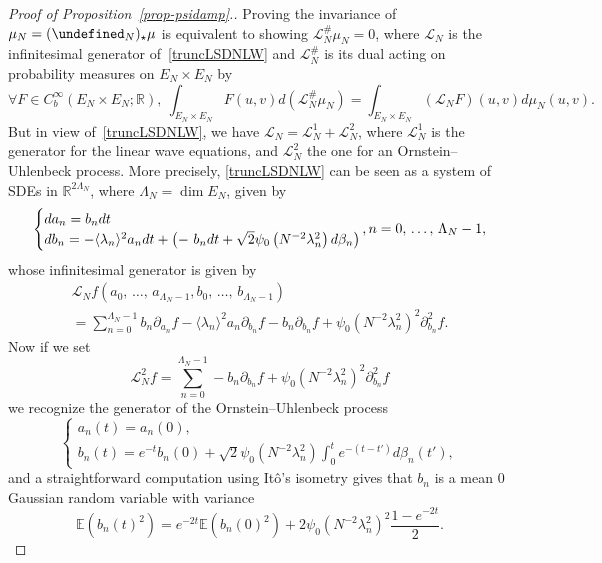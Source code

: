 \documentclass[10pt]{amsart}
\theoremstyle{definition}\newtheorem{defi}[theo]{Definition}\newtheorem{rema}[theo]{Remark}\newtheorem{exam}[theo]{Example}\newtheorem{exem}[theo]{Example}\newtheorem{nota}[theo]{Notation}
\newcommand{\R}{\mathbb{R}}
\newcommand{\E}{\mathbb{E}}
\let\P= \undefined
\newcommand{\P}{\mathbf{P}}
\renewcommand{\L}{\mathcal{L}}
\newcommand{\Ld}{\Lambda}
\newcommand{\jb}[1] {\langle #1 \rangle}
\let\oldforall\forall
\renewcommand*{\forall}{\mathrel{\oldforall}}
\begin{document}
\begin{proof}[Proof of Proposition~\ref{prop-psidamp}.]
Proving the invariance of $\mu_N=(\P_N)_{\star}\mu$ is equivalent to showing $\L_N^\#\mu_N=0$, where $\L_N$ is the infinitesimal generator of~\eqref{truncLSDNLW} and $\L_N^\#$ is its dual acting on probability measures on $E_N\times E_N$ by
\begin{equation*}
\forall F\in C^{\infty}_b(E_N\times E_N;\R),~\int_{E_N\times E_N}F(u,v)d(\L_N^\#\mu_N) = \int_{E_N\times E_N}(\L_NF)(u,v)d\mu_N(u,v).
\end{equation*}
But in view of~\eqref{truncLSDNLW}, we have $\L_N = \L_N^1+\L_N^2$, where $\L_N^1$ is the generator for the linear wave equations, and $\L_N^2$ the one for an Ornstein--Uhlenbeck process. More precisely, \eqref{truncLSDNLW} can be seen as a system of SDEs in $\R^{2\Ld_N}$, where $\Ld_N=\dim E_N$, given by
\begin{equation*}
\begin{cases}
d a_n = b_n dt\\
d b_n = -\jb{\lambda_n}^2a_ndt +\left(-\ b_ndt+\sqrt{2}\psi_0\left(N^{-2}\lambda_n^2\right)d\beta_n\right)
\end{cases}\mkern-20mu, n=0,\,\dots,\,\Ld_N-1,
\end{equation*}
whose infinitesimal generator is given by
\begin{multline*}
\L_Nf\left(a_0,\,\dots,\,a_{\Ld_N-1},b_0,\,\dots,\,b_{\Ld_N-1}\right)\\
= \sum_{n=0}^{\Ld_N-1}b_n\partial_{a_n}f-\jb{\lambda_n}^2a_n\partial_{b_n}f - b_n\partial_{b_n}f+\psi_0\left(N^{-2}\lambda_n^2\right)^2\partial_{b_n}^2f.
\end{multline*}
Now if we set
\begin{equation*}
\L_N^2f = \sum_{n=0}^{\Ld_N-1}-b_n\partial_{b_n}f+\psi_0\left(N^{-2}\lambda_n^2\right)^2\partial_{b_n}^2f
\end{equation*}
we recognize the generator of the Ornstein--Uhlenbeck process
\begin{equation*}
\begin{cases}
a_n(t)=a_n(0),\\
b_n(t)=e^{-t}b_n(0)+\sqrt{2}\psi_0\left(N^{-2}\lambda_n^2\right)\int_0^te^{-(t-t')}d\beta_n(t'),
\end{cases}
\end{equation*}
and a straightforward computation using It\^o's isometry gives that $b_n$ is a mean 0 Gaussian random variable with variance
\begin{equation*}
\E\left(b_n(t)^2\right)=e^{-2t}\E\left(b_n(0)^2\right)+2\psi_0\left(N^{-2}\lambda_n^2\right)^2\frac{1-e^{-2 t}}2.

\end{equation*}
\end{proof}
\end{document}
